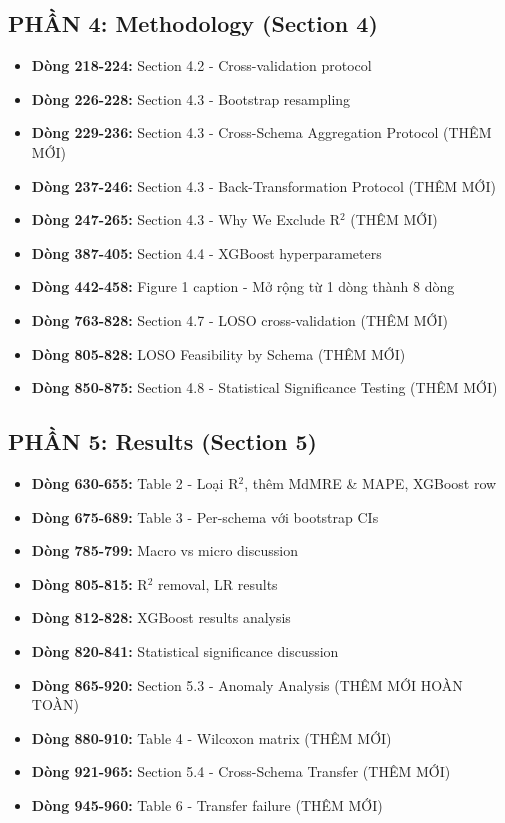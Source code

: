 \documentclass[11pt,a4paper]{article}
\begin{document}
\subsection{PHẦN 4: Methodology (Section 4)}
\begin{itemize}
    \item \textbf{Dòng 218-224:} Section 4.2 - Cross-validation protocol
    \item \textbf{Dòng 226-228:} Section 4.3 - Bootstrap resampling
    \item \textbf{Dòng 229-236:} Section 4.3 - Cross-Schema Aggregation Protocol (THÊM MỚI)
    \item \textbf{Dòng 237-246:} Section 4.3 - Back-Transformation Protocol (THÊM MỚI)
    \item \textbf{Dòng 247-265:} Section 4.3 - Why We Exclude R$^2$ (THÊM MỚI)
    \item \textbf{Dòng 387-405:} Section 4.4 - XGBoost hyperparameters
    \item \textbf{Dòng 442-458:} Figure 1 caption - Mở rộng từ 1 dòng thành 8 dòng
    \item \textbf{Dòng 763-828:} Section 4.7 - LOSO cross-validation (THÊM MỚI)
    \item \textbf{Dòng 805-828:} LOSO Feasibility by Schema (THÊM MỚI)
    \item \textbf{Dòng 850-875:} Section 4.8 - Statistical Significance Testing (THÊM MỚI)
\end{itemize}

\subsection{PHẦN 5: Results (Section 5)}
\begin{itemize}
    \item \textbf{Dòng 630-655:} Table 2 - Loại R$^2$, thêm MdMRE \& MAPE, XGBoost row
    \item \textbf{Dòng 675-689:} Table 3 - Per-schema với bootstrap CIs
    \item \textbf{Dòng 785-799:} Macro vs micro discussion
    \item \textbf{Dòng 805-815:} R$^2$ removal, LR results
    \item \textbf{Dòng 812-828:} XGBoost results analysis
    \item \textbf{Dòng 820-841:} Statistical significance discussion
    \item \textbf{Dòng 865-920:} Section 5.3 - Anomaly Analysis (THÊM MỚI HOÀN TOÀN)
    \item \textbf{Dòng 880-910:} Table 4 - Wilcoxon matrix (THÊM MỚI)
    \item \textbf{Dòng 921-965:} Section 5.4 - Cross-Schema Transfer (THÊM MỚI)
    \item \textbf{Dòng 945-960:} Table 6 - Transfer failure (THÊM MỚI)
\end{itemize}
\end{document}

